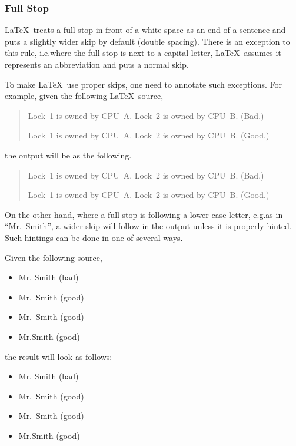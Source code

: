 \subsubsection{Full Stop}
\label{sec:app:styleguide:Full Stop}

\LaTeX\ treats a full stop in front of a white space as an end of
a sentence and puts a slightly wider skip by default (double spacing).
There is an exception to this rule, i.e.\@ where the full stop is next
to a capital letter, \LaTeX\ assumes it represents an abbreviation
and puts a normal skip.

To make \LaTeX\ use proper skips, one need to annotate such exceptions.
For example, given the following \LaTeX\ source,

\begin{VerbatimU}
\begin{quote}
	Lock~1 is owned by CPU~A.
	Lock~2 is owned by CPU~B.  (Bad.)

	Lock~1 is owned by CPU~A\@.
	Lock~2 is owned by CPU~B\@.  (Good.)
\end{quote}
\end{VerbatimU}

\noindent%
the output will be as the following.

\begin{quote}
	Lock~1 is owned by CPU~A.
	Lock~2 is owned by CPU~B.  (Bad.)

	Lock~1 is owned by CPU~A\@.
	Lock~2 is owned by CPU~B\@.  (Good.)
\end{quote}

On the other hand, where a full stop is following a lower case
letter, e.g.\@ as in ``Mr.~Smith'', a wider skip will follow
in the output unless it is properly hinted.
Such hintings can be done in one of several ways.

Given the following source,

\begin{VerbatimU}
\begin{itemize}[nosep]
	\item Mr. Smith (bad)
	\item Mr.~Smith (good)
	\item Mr.\ Smith (good)
	\item Mr.\@ Smith (good)
\end{itemize}
\end{VerbatimU}

\noindent%
the result will look as follows:

\begin{itemize}[nosep]
	\item Mr. Smith (bad)
	\item Mr.~Smith (good)
	\item Mr.\ Smith (good)
	\item Mr.\@ Smith (good)
\end{itemize}

